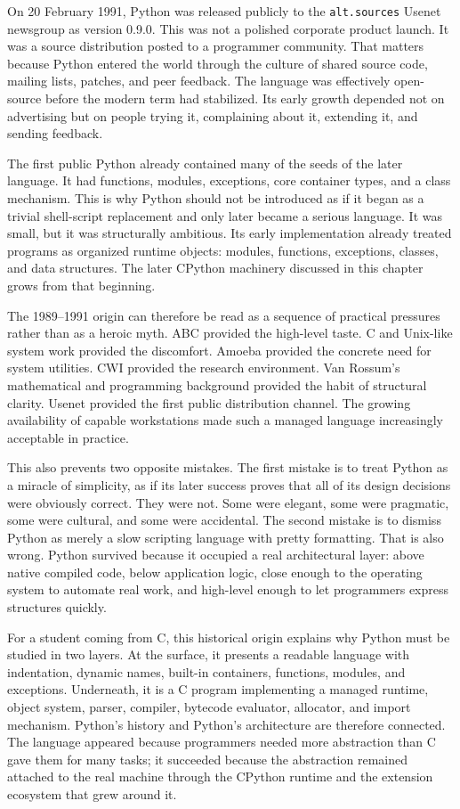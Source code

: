 On 20 February 1991, Python was released publicly to the \texttt{alt.sources} Usenet newsgroup as version 0.9.0. This was not a polished corporate product launch. It was a source distribution posted to a programmer community. That matters because Python entered the world through the culture of shared source code, mailing lists, patches, and peer feedback. The language was effectively open-source before the modern term had stabilized. Its early growth depended not on advertising but on people trying it, complaining about it, extending it, and sending feedback.

The first public Python already contained many of the seeds of the later language. It had functions, modules, exceptions, core container types, and a class mechanism. This is why Python should not be introduced as if it began as a trivial shell-script replacement and only later became a serious language. It was small, but it was structurally ambitious. Its early implementation already treated programs as organized runtime objects: modules, functions, exceptions, classes, and data structures. The later CPython machinery discussed in this chapter grows from that beginning.

The 1989--1991 origin can therefore be read as a sequence of practical pressures rather than as a heroic myth. ABC provided the high-level taste. C and Unix-like system work provided the discomfort. Amoeba provided the concrete need for system utilities. CWI provided the research environment. Van Rossum's mathematical and programming background provided the habit of structural clarity. Usenet provided the first public distribution channel. The growing availability of capable workstations made such a managed language increasingly acceptable in practice.

This also prevents two opposite mistakes. The first mistake is to treat Python as a miracle of simplicity, as if its later success proves that all of its design decisions were obviously correct. They were not. Some were elegant, some were pragmatic, some were cultural, and some were accidental. The second mistake is to dismiss Python as merely a slow scripting language with pretty formatting. That is also wrong. Python survived because it occupied a real architectural layer: above native compiled code, below application logic, close enough to the operating system to automate real work, and high-level enough to let programmers express structures quickly.

For a student coming from C, this historical origin explains why Python must be studied in two layers. At the surface, it presents a readable language with indentation, dynamic names, built-in containers, functions, modules, and exceptions. Underneath, it is a C program implementing a managed runtime, object system, parser, compiler, bytecode evaluator, allocator, and import mechanism. Python's history and Python's architecture are therefore connected. The language appeared because programmers needed more abstraction than C gave them for many tasks; it succeeded because the abstraction remained attached to the real machine through the CPython runtime and the extension ecosystem that grew around it.